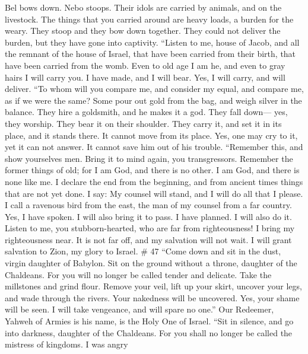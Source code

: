  Bel bows down. Nebo stoops. Their idols are carried by
animals, and on the livestock. The things that you carried around are
heavy loads, a burden for the weary.  They stoop and they
bow down together. They could not deliver the burden, but they have gone
into captivity.  ``Listen to me, house of Jacob, and all the
remnant of the house of Israel, that have been carried from their birth,
that have been carried from the womb.  Even to old age I am
he, and even to gray hairs I will carry you. I have made, and I will
bear. Yes, I will carry, and will deliver.  ``To whom will
you compare me, and consider my equal, and compare me, as if we were the
same?  Some pour out gold from the bag, and weigh silver in
the balance. They hire a goldsmith, and he makes it a god. They fall
down--- yes, they worship.  They bear it on their shoulder.
They carry it, and set it in its place, and it stands there. It cannot
move from its place. Yes, one may cry to it, yet it can not answer. It
cannot save him out of his trouble.  ``Remember this, and
show yourselves men. Bring it to mind again, you transgressors.
 Remember the former things of old; for I am God, and there
is no other. I am God, and there is none like me.  I
declare the end from the beginning, and from ancient times things that
are not yet done. I say: My counsel will stand, and I will do all that I
please.  I call a ravenous bird from the east, the man of
my counsel from a far country. Yes, I have spoken. I will also bring it
to pass. I have planned. I will also do it.  Listen to me,
you stubborn-hearted, who are far from righteousness!  I
bring my righteousness near. It is not far off, and my salvation will
not wait. I will grant salvation to Zion, my glory to Israel. \# 47
 ``Come down and sit in the dust, virgin daughter of
Babylon. Sit on the ground without a throne, daughter of the Chaldeans.
For you will no longer be called tender and delicate.  Take
the millstones and grind flour. Remove your veil, lift up your skirt,
uncover your legs, and wade through the rivers.  Your
nakedness will be uncovered. Yes, your shame will be seen. I will take
vengeance, and will spare no one.''  Our Redeemer, Yahweh of
Armies is his name, is the Holy One of Israel.  ``Sit in
silence, and go into darkness, daughter of the Chaldeans. For you shall
no longer be called the mistress of kingdoms.  I was angry
